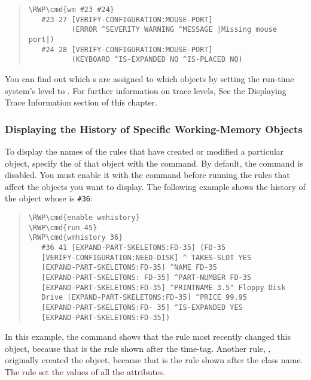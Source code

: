 \begin{quote}
\begin{Verbatim}[commandchars=\\\{\}]
\RWP\cmd{wm #23 #24}
   #23 27 [VERIFY-CONFIGURATION:MOUSE-PORT]
          (ERROR ^SEVERITY WARNING ^MESSAGE |Missing mouse port|)
   #24 28 [VERIFY-CONFIGURATION:MOUSE-PORT]
          (KEYBOARD ^IS-EXPANDED NO ^IS-PLACED NO)
\end{Verbatim}
\end{quote}

You can find out which s are assigned to which
objects by setting the run-time system's  level to . For
further information on trace levels, See the Displaying Trace
Information section of this chapter.

\subsubsection{Displaying the History of Specific Working-Memory
  Objects}

To display the names of the rules that have created or modified a
particular object, specify the  of that object with
the  command. By default, the  command is
disabled. You must enable it with the  command before
running the rules that affect the objects you want to display.  The
following example shows the history of the object whose
 is \verb|#36|:

\begin{quote}
\begin{Verbatim}[commandchars=\\\{\}]
\RWP\cmd{enable wmhistory}
\RWP\cmd{run 45}
\RWP\cmd{wmhistory 36}
   #36 41 [EXPAND-PART-SKELETONS:FD-35] (FD-35
   [VERIFY-CONFIGURATION:NEED-DISK] ^ TAKES-SLOT YES
   [EXPAND-PART-SKELETONS:FD-35] ^NAME FD-35
   [EXPAND-PART-SKELETONS: FD-35] ^PART-NUMBER FD-35
   [EXPAND-PART-SKELETONS:FD-35] ^PRINTNAME 3.5" Floppy Disk
   Drive [EXPAND-PART-SKELETONS:FD-35] ^PRICE 99.95
   [EXPAND-PART-SKELETONS:FD- 35] ^IS-EXPANDED YES
   [EXPAND-PART-SKELETONS:FD-35])
\end{Verbatim}
\end{quote}

In this example, the  command shows that the rule
 most recently changed this object,
because that is the rule shown after the time-tag. Another rule,
, originally created the object,
because that is the rule shown after the class name. The rule
 set the values of all the attributes.

